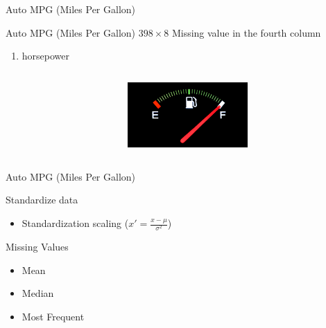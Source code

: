\begin{frame}{Auto MPG (Miles Per Gallon)}


\bi
\mi Auto MPG (Miles Per Gallon)
\mi $398\times8$
\mi Missing value in the fourth column
\begin{enumerate}
    \item horsepower 
  \end{enumerate}
\ei
\begin{columns}[t] %
     \begin{column}[T]{7cm} %
     
     \end{column}
     \begin{column}[T]{5cm} %
          \includegraphics[height=2.5cm]{fig/FuelGauge.jpg}
     \end{column}
 \end{columns}

\end{frame}

\begin{frame}{Auto MPG (Miles Per Gallon)}

\begin{tcolorbox}[colback=LightSteelBlue!5,colframe=yellow!40!black,title=Preprocessing]

\bi
\mi Standardize data
\begin{itemize}
    \item Standardization scaling ($x'=\frac{x-\mu}{\sigma^2}$)
  \end{itemize}

  \mi Missing Values
\begin{itemize}
    \item Mean
    \item Median
    \item Most Frequent
  \end{itemize}
\ei


\end{tcolorbox}
\end{frame}

